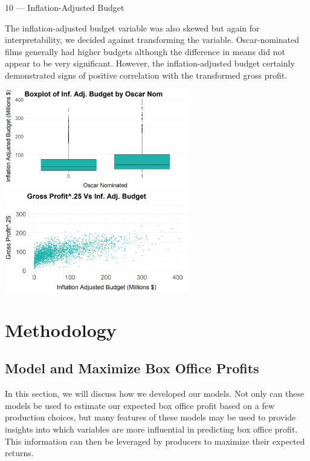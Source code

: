 \documentclass[10pt]{article}
\begin{document}
10 --- Inflation-Adjusted Budget

The inflation-adjusted budget variable was also skewed but again for interpretability, we decided against transforming the variable. Oscar-nominated films generally had higher budgets although the difference in means did not appear to be very significant. However, the inflation-adjusted budget certainly demonstrated signs of positive correlation with the transformed gross profit.

\begin{center}
\includegraphics[width=8cm]{_assets/_eda/budget_on.png}
\hspace{1cm}
\includegraphics[width=8cm]{_assets/_eda/budget_v_profit25_corr_plot.png}
\end{center}

\section{Methodology}

\subsection{Model and Maximize Box Office Profits}

In this section, we will discuss how we developed our models. Not only can these models be used to estimate our expected box office profit based on a few production choices, but many features of these models may be used to provide insights into which variables are more influential in predicting box office profit. This information can then be leveraged by producers to maximize their expected returns.
\end{document}
